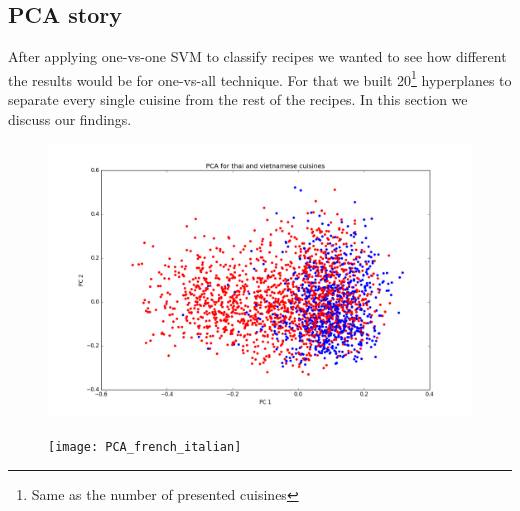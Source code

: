 \documentclass[prodmode,acmtap]{acmlarge}
\begin{document}
\subsection{PCA story}
After applying one-vs-one SVM to classify recipes we wanted to see how different the results would be for one-vs-all technique. For that we built 20\footnote{Same as the number of presented cuisines} hyperplanes to separate every single cuisine from the rest of the recipes. In this section we discuss our findings. 

\begin{figure}[hb]
\centering
\begin{minipage}{.45\textwidth}
  \centering
  \includegraphics[width=\textwidth]{PCA_thai_vietnam}
  \label{thai_taiwan_pca12}
\end{minipage}
\hfill
\begin{minipage}{.45\textwidth}
  \centering
  \texttt{[image: PCA\_french\_italian]}
  \label{french_italian_pca12}
\end{minipage}%
\end{figure}
\end{document}
